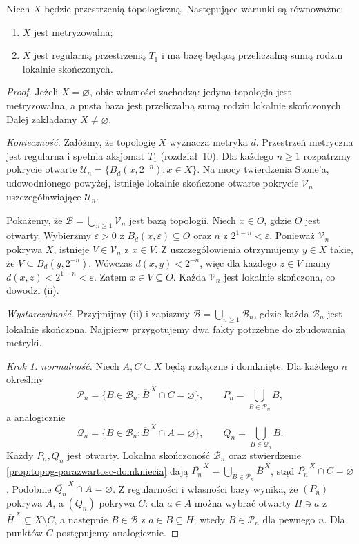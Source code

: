 \begin{twierdzenie}
\label{thm:topog-parazwartosc-nagata-smirnow}
Niech $X$ będzie przestrzenią topologiczną.
Następujące warunki są równoważne:
\begin{enumerate}[label=(\roman*)]
\item $X$ jest metryzowalna;
\item $X$ jest regularną przestrzenią $T_1$
      i ma bazę będącą przeliczalną sumą
      rodzin lokalnie skończonych.
\end{enumerate}
\end{twierdzenie}
\begin{proof}
Jeżeli $X=\varnothing$, obie własności
zachodzą: jedyna topologia jest
metryzowalna, a pusta baza jest
przeliczalną sumą rodzin lokalnie
skończonych. Dalej zakładamy
$X\ne\varnothing$.

\emph{Konieczność.}
Załóżmy, że topologię $X$ wyznacza
metryka $d$. Przestrzeń metryczna
jest regularna i spełnia aksjomat $T_1$
(rozdział~10). Dla każdego $n\ge1$
rozpatrzmy pokrycie otwarte
$\mathcal U_n=\{B_d(x,2^{-n}):x\in X\}$.
Na mocy twierdzenia Stone'a,
udowodnionego powyżej, istnieje
lokalnie skończone otwarte pokrycie
$\mathcal V_n$ uszczegóławiające
$\mathcal U_n$.

Pokażemy, że
$\mathcal B=\bigcup_{n\ge1}\mathcal V_n$
jest bazą topologii.
Niech $x\in O$, gdzie $O$ jest otwarty.
Wybierzmy $\varepsilon>0$
z $B_d(x,\varepsilon)\subseteq O$
oraz $n$ z $2^{1-n}<\varepsilon$.
Ponieważ $\mathcal V_n$ pokrywa $X$,
istnieje $V\in\mathcal V_n$ z $x\in V$.
Z uszczegółowienia otrzymujemy
$y\in X$ takie, że
$V\subseteq B_d(y,2^{-n})$.
Wówczas $d(x,y)<2^{-n}$,
więc dla każdego $z\in V$
mamy $d(x,z)<2^{1-n}<\varepsilon$.
Zatem $x\in V\subseteq O$.
Każda $\mathcal V_n$ jest lokalnie
skończona, co dowodzi (ii).

\emph{Wystarczalność.}
Przyjmijmy (ii) i zapiszmy
$\mathcal B=\bigcup_{n\ge1}\mathcal B_n$,
gdzie każda $\mathcal B_n$ jest lokalnie
skończona. Najpierw przygotujemy
dwa fakty potrzebne do zbudowania metryki.

\emph{Krok 1: normalność.}
Niech $A,C\subseteq X$ będą rozłączne
i domknięte. Dla każdego $n$ określmy
\[
\mathcal P_n=
\{B\in\mathcal B_n:
\overline B^{\,X}\cap C=\varnothing\},
\qquad
P_n=\bigcup_{B\in\mathcal P_n}B,
\]
a analogicznie
\[
\mathcal Q_n=
\{B\in\mathcal B_n:
\overline B^{\,X}\cap A=\varnothing\},
\qquad
Q_n=\bigcup_{B\in\mathcal Q_n}B.
\]
Każdy $P_n,Q_n$ jest otwarty.
Lokalna skończoność $\mathcal B_n$
oraz stwierdzenie
\ref{prop:topog-parazwartosc-domkniecia}
dają
$\overline{P_n}^{\,X}
=\bigcup_{B\in\mathcal P_n}\overline B^{\,X}$,
stąd
$\overline{P_n}^{\,X}\cap C=\varnothing$.
Podobnie
$\overline{Q_n}^{\,X}\cap A=\varnothing$.
Z regularności i własności bazy
wynika, że $(P_n)$ pokrywa $A$,
a $(Q_n)$ pokrywa $C$:
dla $a\in A$ można wybrać
otwarty $H\ni a$ z
$\overline H^{\,X}\subseteq X\setminus C$,
a następnie $B\in\mathcal B$
z $a\in B\subseteq H$;
wtedy $B\in\mathcal P_n$ dla pewnego $n$.
Dla punktów $C$ postępujemy analogicznie.


\end{proof}
